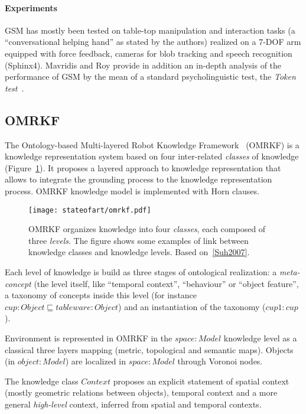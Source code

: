 \paragraph{Experiments} GSM has mostly been tested on table-top manipulation
and interaction tasks (a ``conversational helping hand'' as stated by the
authors) realized on a 7-DOF arm equipped with force feedback, cameras for blob
tracking and speech recognition (Sphinx4). Mavridis and Roy provide in addition
an in-depth analysis of the performance of GSM by the mean of a standard
psycholinguistic test, the \emph{Token test}~\cite{DiSimoni1978}.

\subsection{OMRKF}
\label{sect|omrkf}

The Ontology-based Multi-layered Robot Knowledge Framework~\cite{Suh2007}
(OMRKF) is a knowledge representation system based on four inter-related
\emph{classes} of knowledge (Figure~\ref{fig|omrkf}). It proposes a layered
approach to knowledge representation that allows to integrate the grounding
process to the knowledge representation process. OMRKF knowledge model is
implemented with Horn clauses.

\begin{figure}
    \centering
    \texttt{[image: stateofart/omrkf.pdf]}

    \caption{OMRKF organizes knowledge into four \emph{classes}, each composed
    of three \emph{levels}. The figure shows some examples of link between
    knowledge classes and knowledge levels. Based on~\ref{Suh2007}.}

    \label{fig|omrkf}
\end{figure}

Each level of knowledge is build as three stages of ontological realization: a
\emph{meta-concept} (the level itself, like ``temporal context'', ``behaviour''
or ``object feature'', a taxonomy of concepts inside this level (for instance
$cup : Object \sqsubseteq tableware : Object$) and an instantiation of the
taxonomy ($cup1 : cup$).

Environment is represented in OMRKF in the $space : Model$ knowledge level as a
classical three layers mapping (metric, topological and semantic maps). Objects
(in $object : Model$) are localized in $space : Model$ through Voronoi nodes.

The knowledge class $Context$ proposes an explicit statement of spatial context
(mostly geometric relations between objects), temporal context and a more
general \emph{high-level} context, inferred from spatial and temporal contexts.

